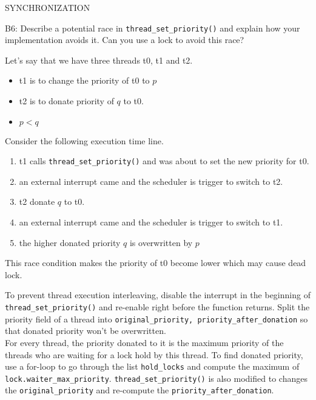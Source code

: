 \begin{aspect}{SYNCHRONIZATION}

	\begin{qc}
		B6: Describe a potential race in \lstinline{thread_set_priority()} and explain how your implementation avoids it.
		Can you use a lock to avoid this race?
	\end{qc}

	Let's say that we have three threads t0, t1 and t2.
	\begin{itemize}
		\item t1 is to change the priority of t0 to $p$
		\item t2 is to donate priority of $q$ to t0.
		\item $p<q$
	\end{itemize}

	Consider the following execution time line.
	\begin{enumerate}
		\item t1 calls \lstinline{thread_set_priority()} and was about to set the new priority for t0.
		\item an external interrupt came and the scheduler is trigger to switch to t2.
		\item t2 donate $q$ to t0.
		\item an external interrupt came and the scheduler is trigger to switch to t1.
		\item the higher donated priority $q$ is overwritten by $p$
	\end{enumerate}
	This race condition makes the priority of t0 become lower which may cause dead lock.

	To prevent thread execution interleaving, disable the interrupt in the beginning of \lstinline{thread_set_priority()} and re-enable right before the function returns.
	Split the priority field of a thread into \lstinline{original_priority, priority_after_donation} so that donated priority won't be overwritten.\\
	For every thread, the priority donated to it is the maximum priority of the threads who are waiting for a lock hold by this thread.
	To find donated priority, use a for-loop to go through the list \lstinline{hold_locks} and compute the maximum of \lstinline{lock.waiter_max_priority}.
	\lstinline{thread_set_priority()} is also modified to changes the \lstinline{original_priority} and re-compute the \lstinline{priority_after_donation}.

\end{aspect}

